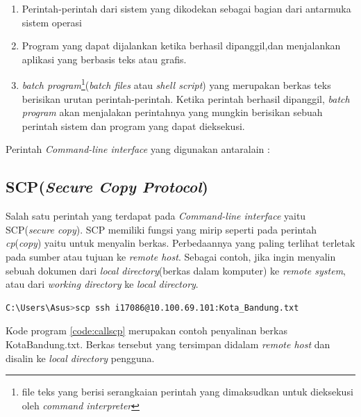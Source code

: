 \begin{enumerate}
	\item Perintah-perintah dari sistem yang dikodekan sebagai bagian dari antarmuka sistem operasi
	\item Program yang dapat dijalankan ketika berhasil dipanggil,dan menjalankan aplikasi yang berbasis teks atau grafis.
	\item \textit{batch program}\footnote{file teks yang berisi serangkaian perintah yang dimaksudkan untuk dieksekusi oleh \textit{command interpreter}}(\textit{batch files} atau \textit{shell script}) yang merupakan berkas teks berisikan urutan perintah-perintah. Ketika perintah berhasil dipanggil, \textit{batch program} akan menjalakan perintahnya yang mungkin berisikan sebuah perintah sistem dan program yang dapat dieksekusi.
\end{enumerate}
Perintah \textit{Command-line interface} yang digunakan antaralain :
\subsection{SCP(\textit{Secure Copy Protocol})}
Salah satu perintah yang terdapat pada \textit{Command-line interface} yaitu SCP(\textit{secure copy}). SCP memiliki fungsi yang mirip seperti pada perintah \emph{cp}(\textit{copy}) yaitu untuk menyalin berkas\cite{william:19:linux}. Perbedaannya yang paling terlihat terletak pada sumber atau tujuan ke \textit{remote host}. Sebagai contoh, jika ingin menyalin sebuah dokumen dari \textit{local directory}(berkas dalam komputer) ke \textit{remote system}, atau dari \textit{working directory} ke \textit{local directory}. 

\begin{lstlisting}[language=Bash, caption=Pemanggilan SCP,label={code:callscp}]
	C:\Users\Asus>scp ssh i17086@10.100.69.101:Kota_Bandung.txt	
\end{lstlisting}

Kode program \ref{code:callscp} merupakan contoh penyalinan berkas Kota\textunderscore Bandung.txt. Berkas tersebut yang tersimpan didalam \textit{remote host} dan disalin ke \textit{local directory} pengguna.


